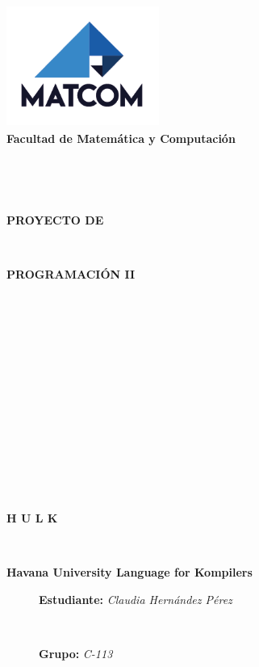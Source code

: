 \documentclass[letterpaper]{article}
\begin{document}
\begin{flushright}
	\includegraphics[width=5cm, height=4cm]{Imagenes/logoMATCOM.png}\\
	{\scriptsize \textbf{Facultad de Matemática y Computación}}
\end{flushright}

\

\

\begin{center}
	\textbf{{\Huge PROYECTO DE }}
	
	\

	\textbf{{\Huge PROGRAMACIÓN II}}
	\

	\

	\

	\

	\

	\

	\

	\

	\

	\textbf{{\Huge H U L K}}

	\
	
	\textbf{{\LARGE Havana University Language for Kompilers}}
\end{center}

\begin{figure}[b]
	\begin{flushleft}
		{\huge \textbf{Estudiante:} \textit{Claudia Hernández Pérez}}

		\
	
		{\LARGE \textbf{Grupo:} \textit{C-113}}
	\end{flushleft}
\end{figure}
\end{document}

